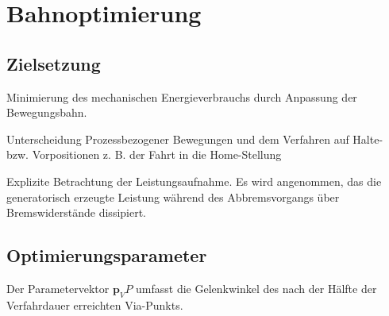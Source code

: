 \chapter{Bahnoptimierung}
\cite{Eggers.2019}
\cite{Engelke.2008}
\cite{Ziaukas.2017}
\cite{Hansen.2012}
\cite{Spong.2020}
\section{Zielsetzung}

Minimierung des mechanischen Energieverbrauchs durch Anpassung der Bewegungsbahn.  

Unterscheidung Prozessbezogener Bewegungen  und dem Verfahren auf Halte- bzw. Vorpositionen z. B. der Fahrt in die Home-Stellung

Explizite Betrachtung der Leistungsaufnahme. Es wird angenommen, das die generatorisch erzeugte Leistung während des Abbremsvorgangs über Bremswiderstände dissipiert. \cite[S.~19]{Eggers.2019}

\section{Optimierungsparameter}
Der Parametervektor $\bm{p}_VP$ \cite[S.~49]{Eggers.2019} umfasst die Gelenkwinkel des nach der Hälfte der Verfahrdauer erreichten Via-Punkts.  


